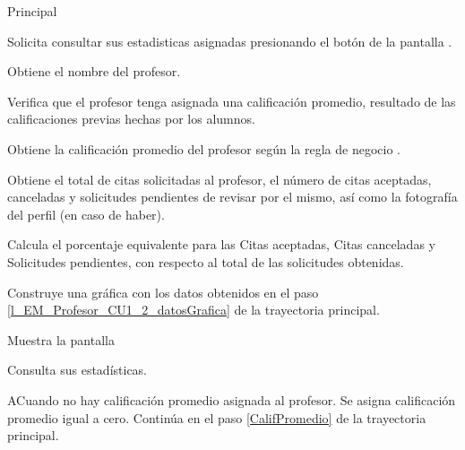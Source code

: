 \begin{UCtrayectoria}{Principal}

	\UCpaso [\UCactor] Solicita consultar sus estadisticas asignadas presionando el botón  de la pantalla .

	\UCpaso Obtiene el nombre del profesor. 

	\UCpaso Verifica que el profesor tenga asignada una calificación promedio, resultado de las calificaciones previas hechas por los alumnos. 

	\UCpaso Obtiene la calificación promedio del profesor según la regla de negocio . \label{CalifPromedio}  

	\UCpaso Obtiene el total de citas solicitadas al profesor, el número de citas aceptadas, canceladas y solicitudes pendientes de revisar por el mismo, así como la fotografía del perfil (en caso de haber). 

	\UCpaso Calcula el porcentaje equivalente para las Citas aceptadas, Citas canceladas y Solicitudes pendientes, con respecto al total de las solicitudes obtenidas. \label{l_EM_Profesor_CU1_2_datosGrafica}

	\UCpaso Construye una gráfica con los datos obtenidos en el paso \ref{l_EM_Profesor_CU1_2_datosGrafica} de la trayectoria principal.

	\UCpaso Muestra la pantalla 

	\UCpaso [\UCactor] Consulta sus estadísticas.

\end{UCtrayectoria}

\begin{UCtrayectoriaA}{A}{Cuando no hay calificación promedio asignada al profesor.}
	\UCpaso	Se asigna calificación promedio igual a cero.
	\UCpaso Continúa en el paso \ref{CalifPromedio} de la trayectoria principal.
\end{UCtrayectoriaA}
